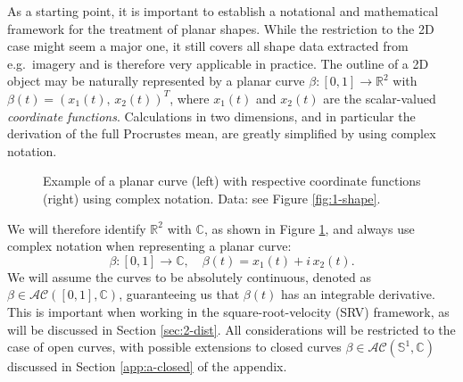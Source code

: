 \label{sec:2}
As a starting point, it is important to establish a notational and mathematical framework for the treatment of planar shapes.
While the restriction to the 2D case might seem a major one, it still covers all shape data extracted from e.g.\ imagery and is therefore very applicable in practice.
The outline of a 2D object may be naturally represented by a planar curve $\beta : [0,1] \rightarrow \mathbb{R}^2$ with $\beta(t) = (x_1(t),\, x_2(t))^T$, where $x_1(t)$ and $x_2(t)$ are the scalar-valued \textit{coordinate functions}.
Calculations in two dimensions, and in particular the derivation of the full Procrustes mean, are greatly simplified by using complex notation.
\begin{figure}
  \centering
  \begin{subfigure}{.48\textwidth}
    \centering
  \end{subfigure}\hfill%
  \begin{subfigure}{.48\textwidth}
    \centering
    \begin{subfigure}{\textwidth}
      \centering
    \end{subfigure}
    \begin{subfigure}{\textwidth}
      \centering
    \end{subfigure}
  \end{subfigure}
  \caption{Example of a planar curve (left) with respective coordinate functions (right) using complex notation. Data: see Figure \ref{fig:1-shape}.}
  \label{fig:2-curve}
\end{figure}
We will therefore identify $\mathbb{R}^2$ with $\mathbb{C}$, as shown in Figure \ref{fig:2-curve}, and always use complex notation when representing a planar curve:
$$\beta : [0,1] \rightarrow \mathbb{C}, \quad \beta(t) = x_1(t) + i\, x_2(t).$$
We will assume the curves to be absolutely continuous, denoted as $\beta \in \mathcal{AC}([0,1], \mathbb{C})$, guaranteeing us that $\beta(t)$ has an integrable derivative.
This is important when working in the square-root-velocity (SRV) framework, as will be discussed in Section \ref{sec:2-dist}.
All considerations will be restricted to the case of open curves, with possible extensions to closed curves $\beta \in \mathcal{AC}(\mathbb{S}^1, \mathbb{C})$ discussed in Section \ref{app:a-closed} of the appendix.


